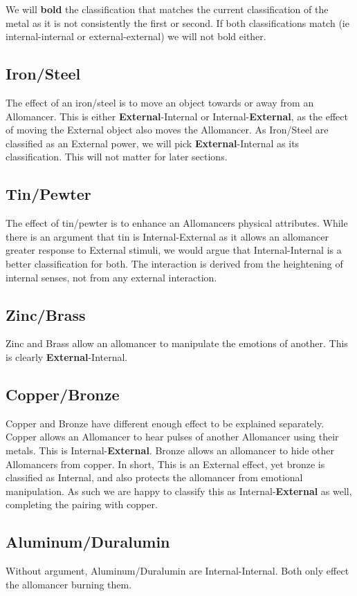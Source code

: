 \documentclass[conference]{IEEEtran}
\begin{document}
We will \textbf{bold} the classification that matches the current classification of the metal as it is not consistently the first or second.  If both classifications match (ie internal-internal or external-external) we will not bold either.

\subsection*{Iron/Steel}
The effect of an iron/steel is to move an object towards or away from an Allomancer.  This is either \textbf{External}-Internal or Internal-\textbf{External}, as the effect of moving the External object also moves the Allomancer.
As Iron/Steel are classified as an External power, we will pick \textbf{External}-Internal as its classification.  This will not matter for later sections.

\subsection*{Tin/Pewter}
The effect of tin/pewter is to enhance an Allomancers physical attributes.  While there is an argument that tin is Internal-External as it allows an allomancer greater response to External stimuli, we would argue that Internal-Internal is a better classification for both.  The interaction is derived from the heightening of internal senses, not from any external interaction.
\subsection*{Zinc/Brass}
Zinc and Brass allow an allomancer to manipulate the emotions of another.  This is clearly \textbf{External}-Internal.
\subsection*{Copper/Bronze}
Copper and Bronze have different enough effect to be explained separately.  Copper allows an Allomancer to hear pulses of another Allomancer using their metals.  This is Internal-\textbf{External}.
Bronze allows an allomancer to hide other Allomancers from copper.  In short, This is an External effect, yet bronze is classified as Internal, and also protects the allomancer from emotional manipulation.  As such we are happy to classify this as Internal-\textbf{External} as well, completing the pairing with copper.
\subsection*{Aluminum/Duralumin}
Without argument, Aluminum/Duralumin are Internal-Internal.  Both only effect the allomancer burning them.
\end{document}
